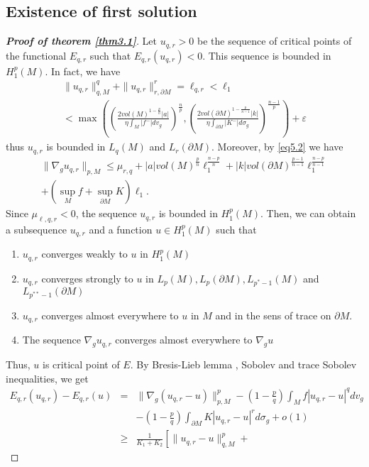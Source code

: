 \documentclass{Tran-l}
\theoremstyle{definition}
\theoremstyle{remark}
\numberwithin{equation}{section}
\begin{document}
\subsection{Existence of first solution}
\begin{proof}[\textbf{Proof of theorem \ref{thm3.1}}]
Let $u_{q,r}>0$  be the sequence of critical points of the
functional $E_{q,r}$ such that $E_{q,r}(u_{q,r})<0$. This sequence
is bounded in $H^p_1(M)$. In fact, we have
\begin{eqnarray*}
 &\|u_{q,r}\|_{q,M}^q+\|u_{q,r}\|_{r,\partial M}^r= \ell_{q,r}<\ell_1&\\&
<\max\left(\left(\frac{2vol(M)^{1-\frac{p}{n}}|a|}
{\eta\int_M|f^-|dv_g}\right)^{\frac{n}{p}},\left(
\frac{2vol(\partial M)^{1-\frac{p}{n-1}}|k|}{\eta\int_{\partial
M}|K^-|d\sigma_g}\right)^{\frac{n-1}{p}}\right)+\varepsilon&
\end{eqnarray*}
thus $u_{q,r}$ is bounded in $L_q(M)$ and $L_r(\partial M)$.
Moreover, by  \eqref{eq5.2} we have
\begin{eqnarray*}
&\|\nabla_gu_{q,r}\|_{p,M}\leq\mu_{r,q}+|a|vol(M)^{\frac{p}{n}}\ell_1^{\frac{n-p}{n}}
+|k|vol(\partial
M)^{\frac{p-1}{n-1}}\ell_1^{\frac{n-p}{n-1}}&\\&+(\sup_{M}f+\sup_{\partial
M}K)\ell_1.&
\end{eqnarray*}
Since $\mu_{\ell,q,r}<0$, the sequence $u_{q,r}$ is bounded in
$H^p_1(M)$. Then, we can obtain a subsequence $u_{q,r}$ and a
function  $u\in H^p_1(M) $ such that
\begin{enumerate}
  \item $u_{q,r}$ converges weakly to $u$ in $H^p_1(M)$
  \item $u_{q,r}$ converges strongly to $u$ in $L_p(M), L_p(\partial M),
 L_{p^*-1}(M) $ and $L_{p^{**}-1}(\partial
M)$
  \item $u_{q,r}$ converges almost everywhere to $u$ in $M$ and in
the sens of trace on $\partial M$.
\item The sequence $\nabla_gu_{q,r}$ converges almost everywhere to $\nabla_gu$
\end{enumerate}
 Thus, $u$ is critical point of $E$. By Bresis-Lieb lemma \cite{Bresis-Lieb},
Sobolev and trace Sobolev inequalities, we get
\begin{eqnarray*}
E_{q,r}(u_{q,r})-E_{q,r}(u)&=&\|\nabla_g(u_{q,r}-u)\|^{p}_{p,M}-(1-\frac{p}{q})\int_Mf|u_{q,r}-u|^qdv_g
\\&&-(1-\frac{p}{q})\int_{\partial
M}K|u_{q,r}-u|^rd\sigma_g+o(1)\\&\geq&
\frac{1}{K_1+K_2}\left[\|u_{q,r}-u\|^{p}_{q,M}+

\end{eqnarray*}
\end{proof}
\end{document}
